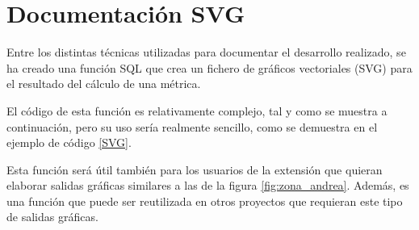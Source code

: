 \chapter{Documentación SVG}\label{anex:svg}

Entre los distintas técnicas utilizadas para documentar el desarrollo realizado, se ha creado una función SQL que crea un fichero de gráficos vectoriales (SVG) para el resultado del cálculo de una métrica. 

El código de esta función es relativamente complejo, tal y como se muestra a continuación, pero su uso sería realmente sencillo, como se demuestra en el ejemplo de código \ref{SVG}.

Esta función será útil también para los usuarios de la extensión que quieran elaborar salidas gráficas similares a las de la figura \ref{fig:zona_andrea}. Además, es una función que puede ser reutilizada en otros proyectos que requieran este tipo de salidas gráficas.


